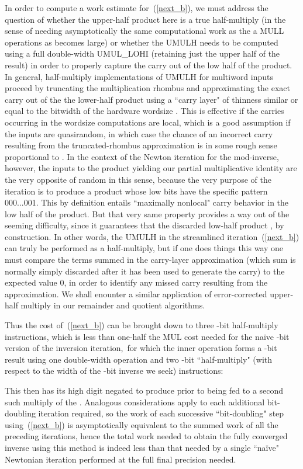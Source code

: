 \documentclass{article}
\begin{document}
In order to compute a work estimate for~(\ref{next_b}), we must address the question of whether the upper-half product here is a true half-multiply (in the sense of needing asymptotically the same computational work as the a MULL operations as  becomes large) or whether the UMULH needs to be computed using a full double-width UMUL\_LOHI (retaining just the upper half of the result) in order to properly capture the carry out of the low half of the product. In general, half-multiply implementations of UMULH for multiword inputs proceed by truncating the multiplication rhombus and approximating the exact carry out of the the lower-half product using a ``carry layer" of thinness similar or equal to the bitwidth of the hardware wordsize . This is effective if the carries occurring in the wordsize computations are local, which is a good assumption if the inputs are quasirandom, in which case the chance of an incorrect carry resulting from the truncated-rhombus approximation is in some rough sense proportional to . In the context of the Newton iteration for the mod-inverse, however, the inputs to the  product yielding our partial multiplicative identity are the very opposite of random in this sense, because the very purpose of the iteration is to produce a product whose low  bits have the specific pattern 000...001. This by definition entails ``maximally nonlocal" carry behavior in the low half of the  product. But that very same property provides a way out of the seeming difficulty, since it guarantees that the discarded low-half product , by construction. In other words, the UMULH in the streamlined iteration~(\ref{next_b}) can truly be performed as a half-multiply, but if one does things this way one must compare the terms summed in the carry-layer approximation (which sum is normally simply discarded after it has been used to generate the carry) to the expected value 0, in order to identify any missed carry resulting from the approximation. We shall enounter a similar application of error-corrected upper-half multiply in our remainder and quotient algorithms.

Thus the cost of~(\ref{next_b}) can be brought down to three -bit half-multiply instructions, which is less than one-half the MUL cost needed for the na\"ive -bit version of the inversion iteration,\ for which the inner  operation forms a -bit result using one double-width  operation and two -bit ``half-multiply" (with respect to the width of the -bit inverse we seek)  instructions:


This then has its high digit negated to produce  prior to being fed to a second such multiply of the . Analogous considerations apply to each additional bit-doubling iteration required, so the work of each successive ``bit-doubling" step using~(\ref{next_b}) is asymptotically equivalent to the summed work of all the preceding iterations, hence the total work needed to obtain the fully converged inverse using this method is indeed less than that needed by a single ``na\"ive" Newtonian iteration performed at the full final precision needed.
\end{document}

